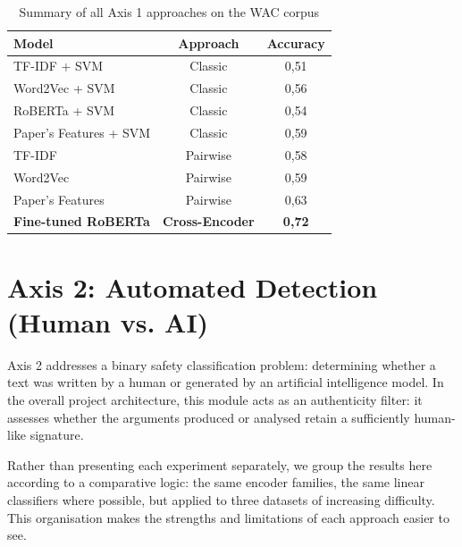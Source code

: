\documentclass[11pt,a4paper]{article}
\begin{document}
\begin{table}[h]
\centering
\begin{tabular}{lcc}
\hline
\textbf{Model} & \textbf{Approach} & \textbf{Accuracy} \\
\hline
TF-IDF + SVM          & Classic    & 0{,}51 \\
Word2Vec + SVM        & Classic    & 0{,}56 \\
RoBERTa + SVM         & Classic    & 0{,}54 \\
Paper's Features + SVM & Classic  & 0{,}59 \\
\hline
TF-IDF                & Pairwise   & 0{,}58 \\
Word2Vec              & Pairwise   & 0{,}59 \\
Paper's Features      & Pairwise   & 0{,}63 \\
\hline
\textbf{Fine-tuned RoBERTa} & \textbf{Cross-Encoder} & \textbf{0{,}72} \\
\hline
\end{tabular}
\caption{Summary of all Axis 1 approaches on the WAC corpus}
\label{tab:axe1_recap}
\end{table}


\newpage

\section{Axis 2: Automated Detection (Human vs. AI)}

Axis 2 addresses a binary safety classification problem: determining whether
a text was written by a human or generated by an artificial intelligence model.
In the overall project architecture, this module acts as an authenticity filter:
it assesses whether the arguments produced or analysed retain a sufficiently
human-like signature.

Rather than presenting each experiment separately, we group the results here
according to a comparative logic: the same encoder families, the same linear
classifiers where possible, but applied to three datasets of increasing difficulty.
This organisation makes the strengths and limitations of each approach easier
to see.
\end{document}
